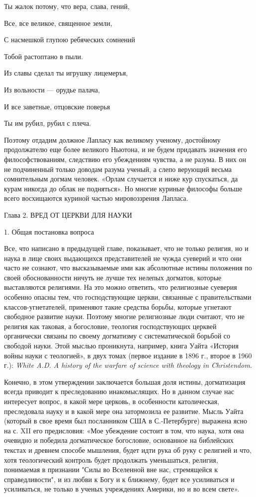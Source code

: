 Ты жалок потому, что вера, слава, гений,

Все, все великое, священное земли,

С насмешкой глупою ребяческих сомнений

Тобой растоптано в пыли.

Из славы сделал ты игрушку лицемеръя,

Из вольности --- орудье палача,

И все заветные, отцовские поверья

Ты им рубил, рубил с плеча.

Поэтому  отдадим  должное  Лапласу как  великому  ученому,  достойному
продолжателю еще более великого Ньютона, и не будем придавать значения
его философствованиям, следствию его  убеждениям чувства, а не разума.
В них он не подчиненный только доводам разума ученый, а слепо верующий
весьма  сомнительным  догмам  человек.  «Орлам случается  и  ниже  кур
спускаться,  да  курам  никогда  до облак  не  подняться».  Но  многие
куриные философы больше всего восхищаются куриной частью мировоззрения
Лапласа.

Глава 2. ВРЕД ОТ ЦЕРКВИ ДЛЯ НАУКИ

1. Общая постановка вопроса

Все,  что  написано в  предыдущей  главе,  показывает, что  не  только
религия,  но  и  наука  в  лице  своих  выдающихся  представителей  не
чужда  суеверий и  что они  часто  не сознают,  что высказываемые  ими
как  абсолютные  истины  положения   по  своей  обоснованности  ничуть
не  лучше  тех  нелепых   догматов,  которые  выставляются  религиями.
На  это  можно  ответить,  что религиозные  суеверия  особенно  опасны
тем,   что   господствующие   церкви,  связанные   с   правительствами
классов-угнетателей, применяют такие средства борьбы, которые угнетают
свободное развитие науки. Поэтому многие религиозные люди считают, что
не религия как таковая,  а богословие, теология господствующих церквей
органически связаны по своему  догматизму с систематической борьбой со
свободой науки. Этой мыслью проникнута, например, книга Уайта «История
войны науки  с теологией»,  в двух  томах (первое  издание в  1896 г.,
второе  в 1960  г.):  \emph{White A.D.  A history  of  the warfare  of
science with theology in Christendom.}

Конечно,  в   этом  утверждении   заключается  большая   доля  истины,
догматизация  всегда  приводит  к преследованию  инакомыслящих.  Но  в
данном  случае  нас  интересует  вопрос,   в  какой  мере  церковь,  в
особенности  католическая,  преследовала  науку  и в  какой  мере  она
затормозила  ее  развитие.  Мысль  Уайта (который  в  свое  время  был
посланником  США  в  С.-Петербурге)  выражена   ясно  на  с.  XII  его
предисловия:  «Мое  убеждение  состоит  в том,  что  наука,  хотя  она
очевидно и победила догматическое богословие, основанное на библейских
текстах и древнем способе мышления, будет идти рука об руку с религией
и  что,  хотя  теологический контроль  будет  продолжать  уменьшаться,
религия,  понимаемая   в  признании   "Силы  во  Вселенной   вне  нас,
стремящейся к справедливости",  и из любви к Богу и  к ближнему, будет
все усиливаться и усиливаться, не только в ученых учреждениях Америки,
но и во всем свете».


